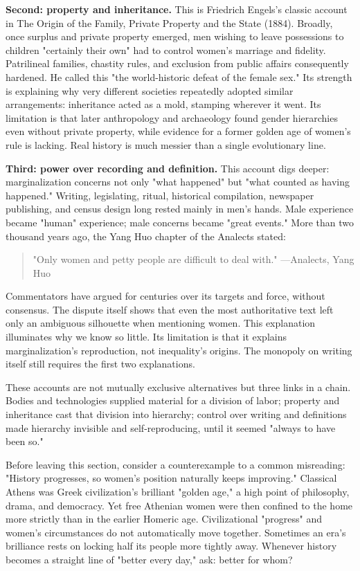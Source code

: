 \textbf{Second: property and inheritance.} This is Friedrich Engels's classic account in The Origin of the Family, Private Property and the State (1884). Broadly, once surplus and private property emerged, men wishing to leave possessions to children "certainly their own" had to control women's marriage and fidelity. Patrilineal families, chastity rules, and exclusion from public affairs consequently hardened. He called this "the world-historic defeat of the female sex." Its strength is explaining why very different societies repeatedly adopted similar arrangements: inheritance acted as a mold, stamping wherever it went. Its limitation is that later anthropology and archaeology found gender hierarchies even without private property, while evidence for a former golden age of women's rule is lacking. Real history is much messier than a single evolutionary line.

\textbf{Third: power over recording and definition.} This account digs deeper: marginalization concerns not only "what happened" but "what counted as having happened." Writing, legislating, ritual, historical compilation, newspaper publishing, and census design long rested mainly in men's hands. Male experience became "human" experience; male concerns became "great events." More than two thousand years ago, the Yang Huo chapter of the Analects stated:

\begin{quote}
"Only women and petty people are difficult to deal with." ---Analects, Yang Huo
\end{quote}
Commentators have argued for centuries over its targets and force, without consensus. The dispute itself shows that even the most authoritative text left only an ambiguous silhouette when mentioning women. This explanation illuminates why we know so little. Its limitation is that it explains marginalization's reproduction, not inequality's origins. The monopoly on writing itself still requires the first two explanations.

These accounts are not mutually exclusive alternatives but three links in a chain. Bodies and technologies supplied material for a division of labor; property and inheritance cast that division into hierarchy; control over writing and definitions made hierarchy invisible and self-reproducing, until it seemed "always to have been so."

Before leaving this section, consider a counterexample to a common misreading: "History progresses, so women's position naturally keeps improving." Classical Athens was Greek civilization's brilliant "golden age," a high point of philosophy, drama, and democracy. Yet free Athenian women were then confined to the home more strictly than in the earlier Homeric age. Civilizational "progress" and women's circumstances do not automatically move together. Sometimes an era's brilliance rests on locking half its people more tightly away. Whenever history becomes a straight line of "better every day," ask: better for whom?

